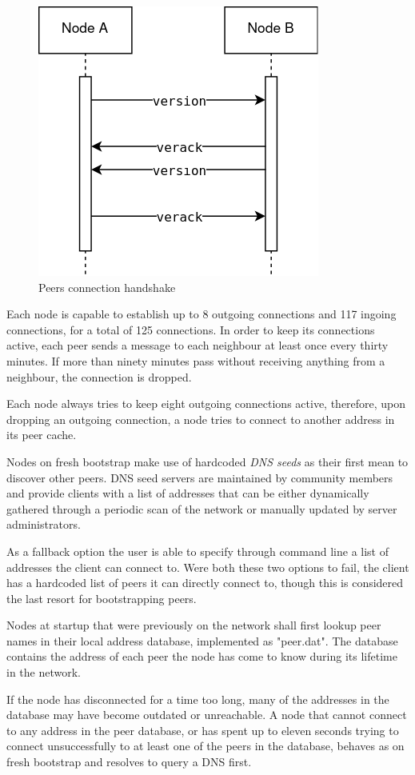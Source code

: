 \begin{figure}[h]
	\includegraphics[width=.45\textwidth]{pict/BTCconnection.png}
	\centering
	\caption{Peers connection handshake}
	\label{fig:btcconn}
\end{figure}

Each node is capable to establish up to 8 outgoing connections and 117 ingoing connections, for a total of 125 connections. In order to keep its connections active, each peer sends a message to each neighbour at least once every thirty minutes. If more than ninety minutes pass without receiving anything from a neighbour, the connection is dropped.

Each node always tries to keep eight outgoing connections active, therefore, upon dropping an outgoing connection, a node tries to connect to another address in its peer cache.\par

Nodes on fresh bootstrap make use of hardcoded \emph{DNS seeds} as their first mean to discover other peers. DNS seed servers are maintained by community members and provide clients with a list of addresses that can be either dynamically gathered through a periodic scan of the network or manually updated by server administrators.

As a fallback option the user is able to specify through command line a list of addresses the client can connect to. Were both these two options to fail, the client has a hardcoded list of peers it can directly connect to, though this is considered the last resort for bootstrapping peers.\par

Nodes at startup that were previously on the network shall first lookup peer names in their local address database, implemented as "peer.dat". The database contains the address of each peer the node has come to know during its lifetime in the network.

If the node has disconnected for a time too long, many of the addresses in the database may have become outdated or unreachable. A node that cannot connect to any address in the peer database, or has spent up to eleven seconds trying to connect unsuccessfully to at least one of the peers in the database, behaves as on fresh bootstrap and resolves to query a DNS first.

